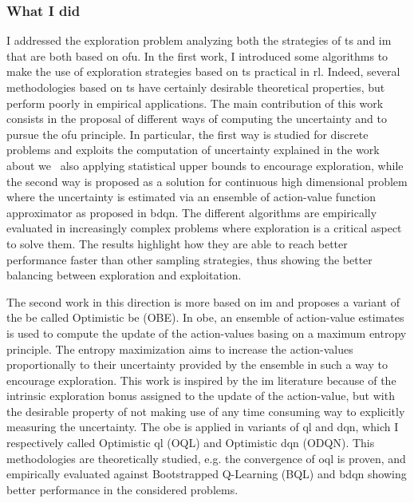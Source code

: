 \subsubsection{What I did}
I addressed the exploration problem analyzing both the strategies of \gls{ts} and \gls{im} that are both based on \gls{ofu}. In the first work, I introduced some algorithms to make the use of exploration strategies based on \gls{ts} practical in \gls{rl}. Indeed, several methodologies based on \gls{ts} have certainly desirable theoretical properties, but perform poorly in empirical applications. The main contribution of this work consists in the proposal of different ways of computing the uncertainty and to pursue the \gls{ofu} principle. In particular, the first way is studied for discrete problems and exploits the computation of uncertainty explained in the work about \gls{we}~\cite{deramo2016estimating} also applying statistical upper bounds to encourage exploration, while the second way is proposed as a solution for continuous high dimensional problem where the uncertainty is estimated via an ensemble of action-value function approximator as proposed in \gls{bdqn}. The different algorithms are empirically evaluated in increasingly complex problems where exploration is a critical aspect to solve them. The results highlight how they are able to reach better performance faster than other sampling strategies, thus showing the better balancing between exploration and exploitation.

The second work in this direction is more based on \gls{im} and proposes a variant of the \gls{be} called Optimistic \gls{be} (OBE). In \gls{obe}, an ensemble of action-value estimates is used to compute the update of the action-values basing on a maximum entropy principle. The entropy maximization aims to increase the action-values proportionally to their uncertainty provided by the ensemble in such a way to encourage exploration. This work is inspired by the \gls{im} literature because of the intrinsic exploration bonus assigned to the update of the action-value, but with the desirable property of not making use of any time consuming way to explicitly measuring the uncertainty. The \gls{obe} is applied in variants of \gls{ql} and \gls{dqn}, which I respectively called Optimistic \gls{ql} (OQL) and Optimistic \gls{dqn} (ODQN). This methodologies are theoretically studied, e.g. the convergence of \gls{oql} is proven, and empirically evaluated against Bootstrapped Q-Learning (BQL) and \gls{bdqn} showing better performance in the considered problems.

